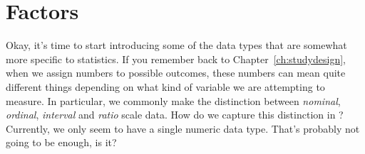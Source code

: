 \section{Factors\label{sec:factors}}


Okay, it's time to start introducing some of the data types that are somewhat more specific to statistics. If you remember back to Chapter~\ref{ch:studydesign}, when we assign numbers to possible outcomes, these numbers can mean quite different things depending on what kind of variable we are attempting to measure. In particular, we commonly make the distinction between {\it nominal}, {\it ordinal}, {\it interval} and {\it ratio} scale data. How do we capture this distinction in \R? Currently, we only seem to have a single numeric data type. That's probably not going to be enough, is it?

